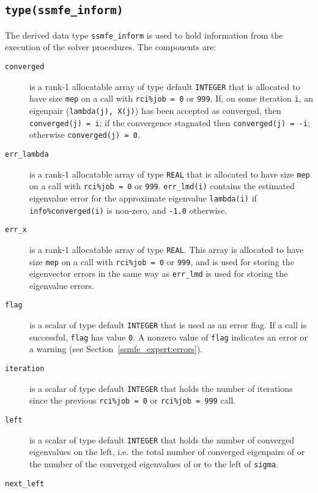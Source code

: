 \subsection{\texttt{type(ssmfe\_inform)}}
\label{ssmfe_expert:type:inform}

The derived data type {\tt ssmfe\_inform} is used
to hold information from the execution of
the solver procedures.
The components are:

\begin{description}
%
\item[\texttt{converged}] is a rank-1 allocatable array of type 
default \texttt{INTEGER} that is allocated to have size {\tt mep} 
on a call with {\tt rci\%job = 0} or {\tt 999}.
If, on some iteration {\tt i}, an eigenpair ({\tt lambda(j), X(j)})
has been accepted as converged,
then {\tt converged(j) = i}; if the convergence stagnated
then {\tt converged(j) = -i}; otherwise {\tt converged(j) = 0}.
%
\item[\texttt{err\_lambda}] is a rank-1 allocatable array of type 
{\tt REAL} that is allocated to have size {\tt mep} 
on a call with {\tt rci\%job = 0} or {\tt 999}.
{\tt err\_lmd(i)} contains 
the estimated eigenvalue error
for the approximate eigenvalue {\tt lambda(i)}
if {\tt info\%converged(i)} is non-zero,
and {\tt -1.0} otherwise.
%
\item[\texttt{err\_x}] is a rank-1 allocatable array of type {\tt REAL}.
This array is allocated to have size {\tt mep} 
on a call with {\tt rci\%job = 0} or {\tt 999},
and is used for storing the eigenvector errors
in the same way as {\tt err\_lmd} is used
for storing the eigenvalue errors.
%
\item[\texttt{flag}] is a scalar of type default \texttt{INTEGER}
that is used as an error flag.
If a call is successful, {\tt flag} has value {\tt 0}.
A nonzero value of {\tt flag} indicates an error or a warning
(see Section~\ref{ssmfe_expert:errors}).
%
\item[\texttt{iteration}] is a scalar of type default \texttt{INTEGER}
that holds the number of iterations 
since the previous {\tt rci\%job = 0} or {\tt rci\%job = 999} call.
%
\item[\texttt{left}]
is a scalar of type default \texttt{INTEGER}
that holds the number of converged eigenvalues on the left,
i.e. the total number of converged eigenpairs of 
or the number of the converged eigenvalues 
of  or 
to the left of {\tt sigma}. 
%
\item[\texttt{next\_left}]

\end{description}
